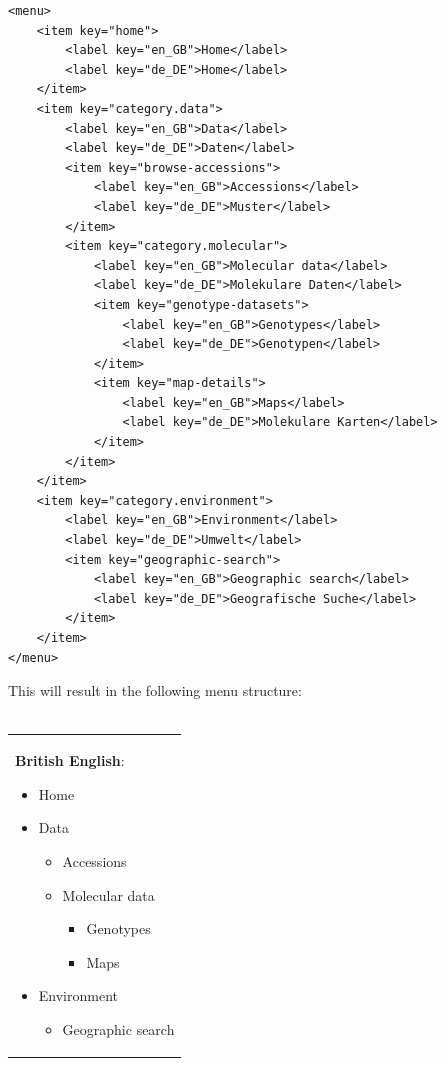 \begin{lstlisting}[style=Xml]
<menu>
	<item key="home">
		<label key="en_GB">Home</label>
		<label key="de_DE">Home</label>
	</item>
	<item key="category.data">
		<label key="en_GB">Data</label>
		<label key="de_DE">Daten</label>
		<item key="browse-accessions">
			<label key="en_GB">Accessions</label>
			<label key="de_DE">Muster</label>
		</item>
		<item key="category.molecular">
			<label key="en_GB">Molecular data</label>
			<label key="de_DE">Molekulare Daten</label>
			<item key="genotype-datasets">
				<label key="en_GB">Genotypes</label>
				<label key="de_DE">Genotypen</label>
			</item>
			<item key="map-details">
				<label key="en_GB">Maps</label>
				<label key="de_DE">Molekulare Karten</label>
			</item>
		</item>
	</item>
	<item key="category.environment">
		<label key="en_GB">Environment</label>
		<label key="de_DE">Umwelt</label>
		<item key="geographic-search">
			<label key="en_GB">Geographic search</label>
			<label key="de_DE">Geografische Suche</label>
		</item>
	</item>
</menu>
\end{lstlisting}
\noindent
This will result in the following menu structure:\\
\\
\begin{tabular}[t]{@{}>{\raggedright\arraybackslash}p{}}
	\textbf{British English}:
	\begin{itemize}
		\item Home
		\item Data
		\begin{itemize}
			\item Accessions
			\item Molecular data
			\begin{itemize}
				\item Genotypes
				\item Maps
			\end{itemize}
		\end{itemize}
		\item Environment
		\begin{itemize}
			\item Geographic search	
		\end{itemize}
	\end{itemize}
\end{tabular}
